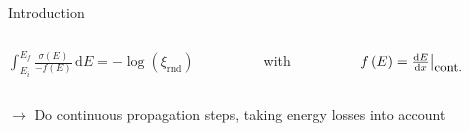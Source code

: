 \documentclass[t]{beamer}
\begin{document}
\begin{block}[equal height group=A]{Introduction}
\begin{multicols}{2}
\begin{tcolorbox}[colback=light-gray,colframe=black,width=0.8\linewidth]
\begin{figure}
\begin{tikzpicture}[scale=2.50]
      \end{tikzpicture}
    \end{figure}
    \end{tcolorbox}
    \vspace{-2.5em}
    \begin{minipage}{0.9\linewidth}
    \begin{columns}[onlytextwidth]
      \Large
      \begin{column}{0.56\textwidth}  
        \centering
        $\displaystyle\int_{E_i}^{E_f} \frac{\sigma\left(E\right)}{-f\left(E\right)} \, \mathrm{d}E = -\log{\left( \xi_\text{rnd} \right)}$
      \end{column}
      \begin{column}{0.06\textwidth}
        \centering
        with
      \end{column}
      \begin{column}{0.38\textwidth}
        \centering
        $f\left(E\right) = \evalat{\frac{\mathrm{d}E}{\mathrm{d}x}}{\text{\small cont.}}$
      \end{column}
    \end{columns}
      \vspace{0.5em}
      \centering
        \textcolor{tugreen}{$\rightarrow$} Do continuous propagation steps, taking energy losses into account
    \end{minipage}




\end{multicols}
\end{block}
\end{document}
